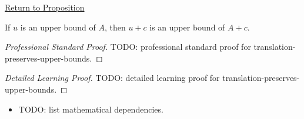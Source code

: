 \newpage
{}
\label{prf:translation-preserves-upper-bounds}

\begin{remark*}[Return]
\hyperref[prop:translation-preserves-upper-bounds]{Return to Proposition}
\end{remark*}

\begin{proposition*}
If $u$ is an upper bound of $A$, then $u+c$ is an upper bound of $A+c$.
\end{proposition*}

\begin{proof}[Professional Standard Proof]
\LRAProofBodyStart
TODO: professional standard proof for translation-preserves-upper-bounds.
\end{proof}

\begin{proof}[Detailed Learning Proof]
\LRAProofBodyStart
TODO: detailed learning proof for translation-preserves-upper-bounds.
\end{proof}

\begin{remark*}
\end{remark*}

\begin{dependencies}
\begin{itemize}
  \item TODO: list mathematical dependencies.
\end{itemize}
\end{dependencies}

\clearpage
